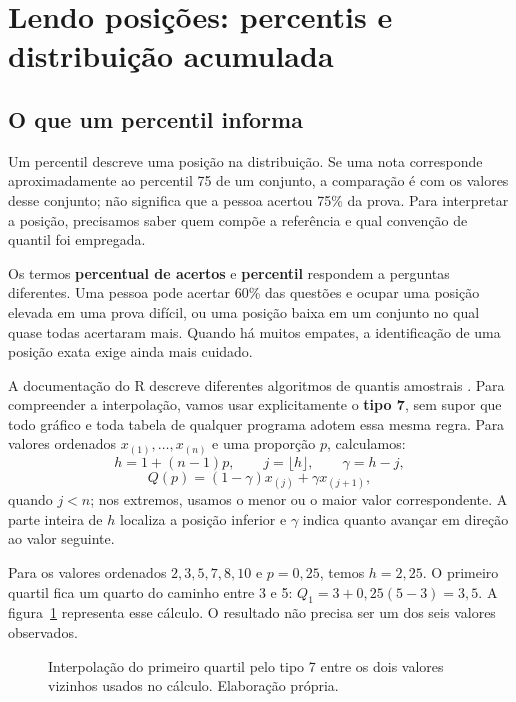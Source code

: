 \section{Lendo posições: percentis e distribuição acumulada}
\label{sec:quantis-acumulada}

\subsection{O que um percentil informa}

Um percentil descreve uma posição na distribuição. Se uma nota corresponde aproximadamente ao percentil 75 de um conjunto, a comparação é com os valores desse conjunto; não significa que a pessoa acertou 75\% da prova. Para interpretar a posição, precisamos saber quem compõe a referência e qual convenção de quantil foi empregada.

Os termos \textbf{percentual de acertos} e \textbf{percentil} respondem a perguntas diferentes. Uma pessoa pode acertar 60\% das questões e ocupar uma posição elevada em uma prova difícil, ou uma posição baixa em um conjunto no qual quase todas acertaram mais. Quando há muitos empates, a identificação de uma posição exata exige ainda mais cuidado.

A documentação do R descreve diferentes algoritmos de quantis amostrais \parencite{RQuantis}. Para compreender a interpolação, vamos usar explicitamente o \textbf{tipo 7}, sem supor que todo gráfico e toda tabela de qualquer programa adotem essa mesma regra. Para valores ordenados $x_{(1)},\ldots,x_{(n)}$ e uma proporção $p$, calculamos:
\[
 h=1+(n-1)p,\qquad j=\lfloor h\rfloor,\qquad \gamma=h-j,
\]
\[
 Q(p)=(1-\gamma)x_{(j)}+\gamma x_{(j+1)},
\]
quando $j<n$; nos extremos, usamos o menor ou o maior valor correspondente. A parte inteira de $h$ localiza a posição inferior e $\gamma$ indica quanto avançar em direção ao valor seguinte.

Para os valores ordenados $2,3,5,7,8,10$ e $p=0{,}25$, temos $h=2{,}25$. O primeiro quartil fica um quarto do caminho entre 3 e 5: $Q_1=3+0{,}25(5-3)=3{,}5$. A figura~\ref{fig:interpolacao-quartil} representa esse cálculo. O resultado não precisa ser um dos seis valores observados.

\begin{figure}[H]
\centering
{}
\caption{Interpolação do primeiro quartil pelo tipo 7 entre os dois valores vizinhos usados no cálculo. Elaboração própria.}
\label{fig:interpolacao-quartil}
\end{figure}

